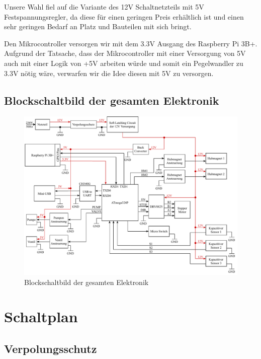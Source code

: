 Unsere Wahl fiel auf die Variante des 12V Schaltnetzteils mit 5V Festspannungsregler, da diese für einen geringen Preis erhältlich ist
und einen sehr geringen Bedarf an Platz und Bauteilen mit sich bringt.

Den Mikrocontroller versorgen wir mit dem 3.3V Ausgang des Raspberry Pi 3B+.
Aufgrund der Tatsache, dass der Mikrocontroller mit einer Versorgung von 5V auch mit einer Logik von +5V arbeiten würde und somit ein Pegelwandler zu 3.3V nötig wäre,
verwarfen wir die Idee diesen mit 5V zu versorgen.

\newpage

\subsection{Blockschaltbild der gesamten Elektronik}

\begin{figure}[hb]
\centering
\includegraphics[scale=0.85,page=1]{fig/elektro/ElectroBlockDiagram.pdf}
\caption{Blockschaltbild der gesamten Elektronik}
\end{figure}

\newpage


\section{Schaltplan}

\subsection{Verpolungsschutz}

